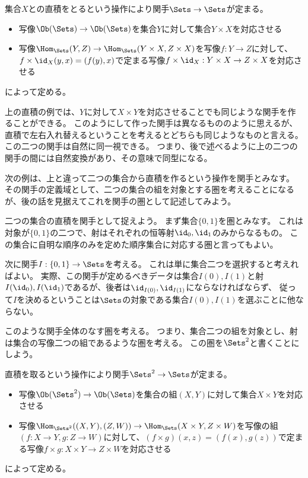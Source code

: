 \documentclass[uplatex]{jsarticle}
\begin{document}
\begin{eg}
集合$X$との直積をとるという操作により関手$\Sets \to \Sets$が定まる。

\begin{itemize}
\item 写像$\Ob(\Sets)\to \Ob(\Sets)$を集合$Y$に対して集合$Y \times X$を対応させる
\item 写像$\Hom_{\Sets}(Y,Z)\to \Hom_{\Sets}(Y\times X,Z \times X)$を写像$f:Y \to Z$に対して、$f\times \id_X(y,x)=(f(y),x)$で定まる写像$f\times \id_X:Y \times X \to Z \times X$を対応させる
\end{itemize}
によって定める。
\end{eg}
上の直積の例では、$Y$に対して$X \times Y$を対応させることでも同じような関手を作ることができる。
このようにして作った関手は異なるもののように思えるが、直積で左右入れ替えるということを考えるとどちらも同じようなものと言える。
この二つの関手は自然に同一視できる。
つまり、後で述べるように上の二つの関手の間には自然変換があり、その意味で同型になる。

\vspace{10pt}
次の例は、上と違って二つの集合から直積を作るという操作を関手とみなす。
その関手の定義域として、二つの集合の組を対象とする圏を考えることになるが、後の話を見据えてこれを関手の圏として記述してみよう。
\begin{eg}
二つの集合の直積を関手として捉えよう。
まず集合$\{0,1\}$を圏とみなす。
これは対象が$\{0,1\}$の二つで、射はそれぞれの恒等射$\id_0, \id_1$のみからなるもの。
この集合に自明な順序のみを定めた順序集合に対応する圏と言ってもよい。

次に関手$I:\{0,1\} \to \Sets$を考える。
これは単に集合二つを選択すると考えればよい。
実際、この関手が定めるべきデータは集合$I(0), I(1)$と射$I(\id_0), I(\id_1)$であるが、後者は$\id_{I(0)}, \id_{I(1)}$にならなければならず、
従って$I$を決めるということは$\Sets$の対象である集合$I(0), I(1)$を選ぶことに他ならない。

このような関手全体のなす圏を考える。
つまり、集合二つの組を対象とし、射は集合の写像二つの組であるような圏を考える。
この圏を$\Sets^2$と書くことにしよう。

直積を取るという操作により関手$\Sets^2 \to \Sets$が定まる。
\begin{itemize}
\item 写像$\Ob(\Sets^2)\to \Ob(\Sets)$を集合の組$(X,Y)$に対して集合$X \times Y$を対応させる
\item 写像$\Hom_{\Sets^2}((X,Y),(Z,W))\to \Hom_{\Sets}(X\times Y,Z \times W)$を写像の組$(f:X \to Y, g:Z \to W)$に対して、$(f \times g)(x,z)=(f(x), g(z))$で定まる写像$f\times g:X \times Y \to Z \times W$を対応させる
\end{itemize}
によって定める。
\end{eg}
\end{document}
